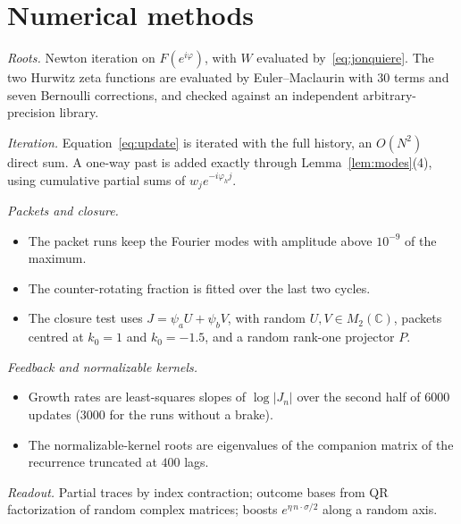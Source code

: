 \documentclass[11pt]{amsart}
\theoremstyle{definition}
\theoremstyle{remark}
\begin{document}
\section{Numerical methods}\label{app:num}

\emph{Roots.} Newton iteration on $F(e^{i\varphi})$, with $W$ evaluated by~\eqref{eq:jonquiere}. The two Hurwitz zeta functions are evaluated by Euler--Maclaurin with $30$ terms and seven Bernoulli corrections, and checked against an independent arbitrary-precision library.

\emph{Iteration.} Equation~\eqref{eq:update} is iterated with the full history, an $O(N^2)$ direct sum. A one-way past is added exactly through Lemma~\ref{lem:modes}(4), using cumulative partial sums of $w_je^{-i\varphi_hj}$.

\emph{Packets and closure.}
\begin{itemize}
\item The packet runs keep the Fourier modes with amplitude above $10^{-9}$ of the maximum.
\item The counter-rotating fraction is fitted over the last two cycles.
\item The closure test uses $J=\psi_aU+\psi_bV$, with random $U,V\in M_2(\mathbb C)$, packets centred at $k_0=1$ and $k_0=-1.5$, and a random rank-one projector $P$.
\end{itemize}

\emph{Feedback and normalizable kernels.}
\begin{itemize}
\item Growth rates are least-squares slopes of $\log\lvert J_n\rvert$ over the second half of $6000$ updates ($3000$ for the runs without a brake).
\item The normalizable-kernel roots are eigenvalues of the companion matrix of the recurrence truncated at $400$ lags.
\end{itemize}

\emph{Readout.} Partial traces by index contraction; outcome bases from QR factorization of random complex matrices; boosts $e^{\eta\,n\cdot\sigma/2}$ along a random axis.
\end{document}
